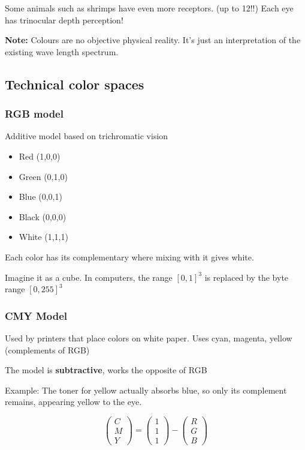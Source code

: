 \documentclass{article}
\begin{document}
Some animals such as shrimps have even more receptors. (up to 12!!) Each eye has trinocular depth perception!

\textbf{Note: } Colours are no objective physical reality. It's just an interpretation of the existing wave length spectrum.


\subsection{Technical color spaces}

\subsubsection{RGB model}

Additive model based on trichromatic vision

\begin{itemize}
  \item Red (1,0,0)
  \item Green (0,1,0)
  \item Blue (0,0,1)
  \item Black (0,0,0)
  \item White (1,1,1)
\end{itemize}

Each color has its complementary where mixing with it gives white.

Imagine it as a cube. In computers, the range $[0,1]^3$ is replaced by the byte range $[0,255]^3$

\subsubsection{CMY Model}

Used by printers that place colors on white paper. Uses cyan, magenta, yellow (complements of RGB)

The model is \textbf{subtractive}, works the opposite of RGB

Example: The toner for yellow actually absorbs blue, so only its complement remains, appearing yellow to the eye.

\[
\begin{pmatrix}
C\\
M \\
Y
\end{pmatrix}
=
\begin{pmatrix}
1\\
1 \\
1
\end{pmatrix}
-
\begin{pmatrix}
R\\
G \\
B
\end{pmatrix}
\]
\end{document}
